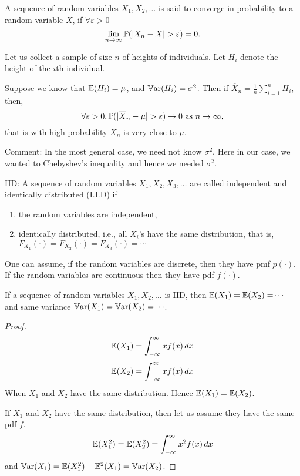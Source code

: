 \documentclass[10pt, a4paper]{article}
\begin{document}
\begin{definition}
    A sequence of random variables $X_1, X_2, \dotsc$ is said to converge in probability to a random variable $X$,
    if $\forall \varepsilon > 0$
    \[
    \lim_{n \rightarrow \infty}\P(|X_n - X| > \varepsilon) = 0.
    \]
\end{definition}

\begin{example}
    Let us collect a sample of size $n$ of heights of individuals.
    Let $H_i$ denote the height of the $i$th individual.

    Suppose we know that $\E(H_i) = \mu$,
    and $\Var(H_i) = \sigma ^ 2$.
    Then if $\overline{X}_n = \frac{1}{n}\sum_{i = 1}^{n}H_i$,
    then,
    \[
    \forall \varepsilon > 0, \P(|\overline{X}_n - \mu| > \varepsilon) \rightarrow 0\text{ as } n \rightarrow \infty,
    \]
    that is with high probability $\overline{X}_n$ is very close to $\mu$.
\end{example}

Comment:
In the most general case,
we need not know $\sigma ^ 2$.
Here in our case,
we wanted to Chebyshev's inequality and hence we needed $\sigma ^ 2$.

IID:
A sequence of random variables $X_1, X_2, X_3, \dotsc$ are called independent and identically distributed
(I.I.D)
if
\begin{enumerate}[label = (\roman*)]
    \item the random variables are independent,
    \item identically distributed,
    i.e.,
    all $X_i$'s have the same distribution,
    that is,
    $F_{X_1}(\cdot) = F_{X_2}(\cdot) = F_{X_3}(\cdot) = \dotsi$
\end{enumerate}

One can assume,
if the random variables are discrete,
then they have pmf $p(\cdot)$.
If the random variables are continuous then they have pdf $f(\cdot)$.

If a sequence of random variables $X_1, X_2, \dotsc$ is IID,
then $\E(X_1) = \E(X_2) = \dotsi$
and same variance $\Var(X_1) = \Var(X_2) = \dotsi$.

\begin{proof}
    \[
    \E(X_1) = \int_{-\infty}^{\infty}xf(x)\,dx
    \]
    \[
    \E(X_2) = \int_{-\infty}^{\infty}xf(x)\,dx
    \]
    When $X_1$ and $X_2$ have the same distribution.
    Hence $\E(X_1) = \E(X_2)$.

    If $X_1$ and $X_2$ have the same distribution,
    then let us assume they have the same pdf $f$.
    \[
    \E(X_1 ^ 2) = \E(X_2 ^ 2) = \int_{-\infty}^{\infty}x ^ 2f(x)\,dx
    \]
    and $\Var(X_1) = \E(X_1 ^ 2) - \E ^ 2(X_1) = \Var(X_2)$.
\end{proof}
\end{document}
